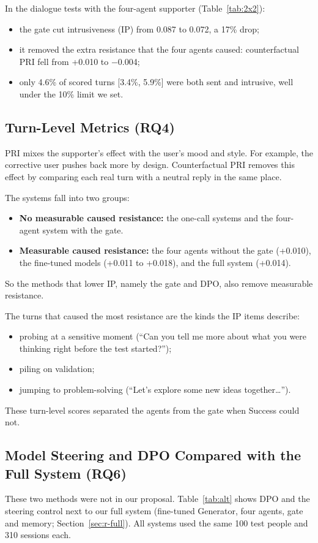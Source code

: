 \documentclass[journal]{IEEEtran}
\begin{document}
In the dialogue tests with the four-agent supporter (Table~\ref{tab:2x2}):
\begin{itemize}
\item the gate cut intrusiveness (IP) from 0.087 to 0.072, a 17\% drop;
\item it removed the extra resistance that the four agents caused: counterfactual PRI fell from +0.010 to $-$0.004;
\item only 4.6\% of scored turns [3.4\%, 5.9\%] were both sent and intrusive, well under the 10\% limit we set.
\end{itemize}

\subsection{Turn-Level Metrics (RQ4)}\label{sec:r-turn}
PRI mixes the supporter's effect with the user's mood and style. For example, the corrective user pushes back more by design. Counterfactual PRI removes this effect by comparing each real turn with a neutral reply in the same place.

The systems fall into two groups:
\begin{itemize}
\item \textbf{No measurable caused resistance:} the one-call systems and the four-agent system with the gate.
\item \textbf{Measurable caused resistance:} the four agents without the gate (+0.010), the fine-tuned models (+0.011 to +0.018), and the full system (+0.014).
\end{itemize}
So the methods that lower IP, namely the gate and DPO, also remove measurable resistance.

The turns that caused the most resistance are the kinds the IP items describe:
\begin{itemize}
\item probing at a sensitive moment (``Can you tell me more about what you were thinking right before the test started?'');
\item piling on validation;
\item jumping to problem-solving (``Let's explore some new ideas together\ldots'').
\end{itemize}
These turn-level scores separated the agents from the gate when Success could not.

\subsection{Model Steering and DPO Compared with the Full System (RQ6)}\label{sec:r-alt}
These two methods were not in our proposal. Table~\ref{tab:alt} shows DPO and the steering control next to our full system (fine-tuned Generator, four agents, gate and memory; Section~\ref{sec:r-full}). All systems used the same 100 test people and 310 sessions each.
\end{document}
